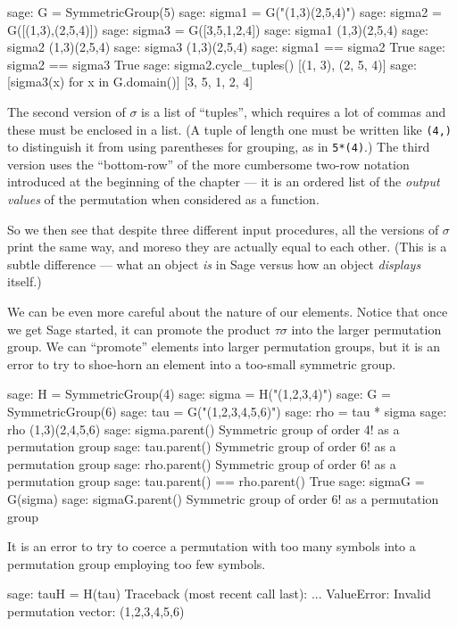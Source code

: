 %
\begin{sageexample}
sage: G = SymmetricGroup(5)
sage: sigma1 = G("(1,3)(2,5,4)")
sage: sigma2 = G([(1,3),(2,5,4)])
sage: sigma3 = G([3,5,1,2,4])
sage: sigma1
(1,3)(2,5,4)
sage: sigma2
(1,3)(2,5,4)
sage: sigma3
(1,3)(2,5,4)
sage: sigma1 == sigma2
True
sage: sigma2 == sigma3
True
sage: sigma2.cycle_tuples()
[(1, 3), (2, 5, 4)]
sage: [sigma3(x) for x in G.domain()]
[3, 5, 1, 2, 4]
\end{sageexample}
%
The second version of $\sigma$ is a list of ``tuples'', which requires a lot of commas and these must be enclosed in a list.  (A tuple of length one must be written like \verb?(4,)? to distinguish it from using parentheses for grouping, as in \verb?5*(4)?.)  The third version uses the ``bottom-row'' of the more cumbersome two-row notation introduced at the beginning of the chapter --- it is an ordered list of the \emph{output values} of the permutation when considered as a function.\par
%
So we then see that despite three different input procedures, all the versions of $\sigma$ print the same way, and moreso they are actually equal to each other.  (This is a subtle difference --- what an object \emph{is} in Sage versus how an object \emph{displays} itself.)\par
%
We can be even more careful about the nature of our elements.  Notice that once we get Sage started, it can promote the product $\tau\sigma$ into the larger permutation group.  We can ``promote'' elements into larger permutation groups, but it is an error to try to shoe-horn an element into a too-small symmetric group.
%
\begin{sageexample}
sage: H = SymmetricGroup(4)
sage: sigma = H("(1,2,3,4)")
sage: G = SymmetricGroup(6)
sage: tau = G("(1,2,3,4,5,6)")
sage: rho = tau * sigma
sage: rho
(1,3)(2,4,5,6)
sage: sigma.parent()
Symmetric group of order 4! as a permutation group
sage: tau.parent()
Symmetric group of order 6! as a permutation group
sage: rho.parent()
Symmetric group of order 6! as a permutation group
sage: tau.parent() == rho.parent()
True
sage: sigmaG = G(sigma)
sage: sigmaG.parent()
Symmetric group of order 6! as a permutation group
\end{sageexample}
%
It is an error to try to coerce a permutation with too many symbols into a permutation group employing too few symbols.
%
\begin{sageexample}
sage: tauH = H(tau)
Traceback (most recent call last):
...
ValueError: Invalid permutation vector: (1,2,3,4,5,6)
\end{sageexample}
